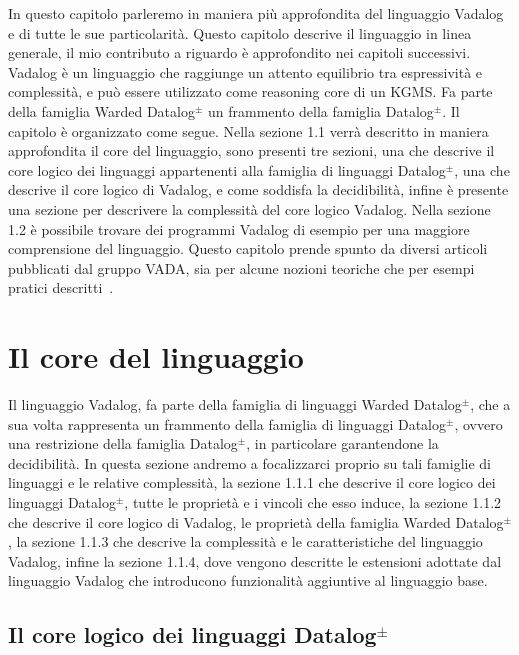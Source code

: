 In questo capitolo parleremo in maniera più approfondita del linguaggio Vadalog e di tutte le sue particolarità. Questo capitolo descrive il linguaggio in linea generale, il mio contributo a riguardo è approfondito nei capitoli successivi. \newline
Vadalog è un linguaggio che raggiunge un attento equilibrio tra espressività e complessità, e può essere utilizzato come reasoning core di un KGMS. Fa parte della famiglia Warded Datalog$^\pm$ un frammento della famiglia Datalog$^\pm$. \newline 
Il capitolo è organizzato come segue. Nella sezione 1.1 verrà descritto in maniera approfondita il core del linguaggio, sono presenti tre sezioni, una che descrive il core logico dei linguaggi appartenenti alla famiglia di linguaggi Datalog$^\pm$, una che descrive il core logico di Vadalog, e come soddisfa la decidibilità, infine è presente una sezione per descrivere la complessità del core logico Vadalog.
Nella sezione 1.2 è possibile trovare dei programmi Vadalog di esempio per una maggiore comprensione del linguaggio. \newline
Questo capitolo prende spunto da diversi articoli pubblicati dal gruppo VADA, sia per alcune nozioni teoriche che per esempi pratici descritti~\cite{bellomarini2017swift, gottlob2015beyond}.

\section{Il core del linguaggio}

Il linguaggio Vadalog, fa parte della famiglia di linguaggi Warded Datalog$^\pm$, che a sua volta rappresenta un frammento della famiglia di linguaggi Datalog$^\pm$, ovvero una restrizione della famiglia Datalog$^\pm$, in particolare garantendone la decidibilità. \newline
In questa sezione andremo a focalizzarci proprio su tali famiglie di linguaggi e le relative complessità, la sezione 1.1.1 che descrive il core logico dei linguaggi Datalog$^\pm$, tutte le proprietà e i vincoli che esso induce, la sezione 1.1.2 che descrive il core logico di Vadalog, le proprietà della famiglia Warded Datalog$^\pm$, la sezione 1.1.3 che descrive la complessità e le caratteristiche del linguaggio Vadalog, infine la sezione 1.1.4, dove vengono descritte le estensioni adottate dal linguaggio Vadalog che introducono funzionalità aggiuntive al linguaggio base.\newline

\subsection{Il core logico dei linguaggi Datalog$^\pm$}

